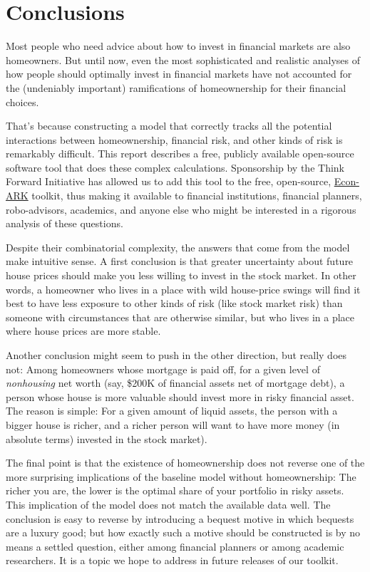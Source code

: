 
  \section{Conclusions}

  Most people who need advice about how to invest in financial markets are also homeowners. But until now, even the most sophisticated and realistic analyses of how people should optimally invest in financial markets have not accounted for the (undeniably important) ramifications of homeownership for their financial choices.

  That's because constructing a model that correctly tracks all the potential interactions between homeownership, financial risk, and other kinds of risk is remarkably difficult. This report describes a free, publicly available open-source software tool that does these complex calculations.  Sponsorship by the Think Forward Initiative has allowed us to add this tool to the free, open-source, \href{https://econ-ark.org}{Econ-ARK} toolkit, thus making it available to financial institutions, financial planners, robo-advisors, academics, and anyone else who might be interested in a rigorous analysis of these questions.

  Despite their combinatorial complexity, the answers that come from the model make intuitive sense. A first conclusion is that greater uncertainty about future house prices should make you less willing to invest in the stock market.  In other words, a homeowner who lives in a place with wild house-price swings will find it best to have less exposure to other kinds of risk (like stock market risk) than someone with circumstances that are otherwise similar, but who lives in a place where house prices are more stable.

  Another conclusion might seem to push in the other direction, but really does not: Among homeowners whose mortgage is paid off, for a given level of \textit{nonhousing} net worth (say, \$200K of financial assets net of mortgage debt), a person whose house is more valuable should invest more in risky financial asset.  The reason is simple:  For a given amount of liquid assets, the person with a bigger house is richer, and a richer person will want to have more money (in absolute terms) invested in the stock market).

  The final point is that the existence of homeownership does not reverse one of the more surprising implications of the baseline model without homeownership:  The richer you are, the lower is the optimal share of your portfolio in risky assets.  This implication of the model does not match the available data well.  The conclusion is easy to reverse by introducing a bequest motive in which bequests are a luxury good; but how exactly such a motive should be constructed is by no means a settled question, either among financial planners or among academic researchers.  It is a topic we hope to address in future releases of our toolkit.


